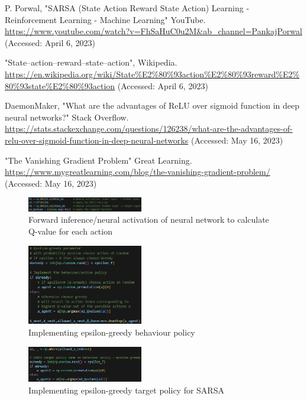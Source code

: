\documentclass[conference]{IEEEtran}
\begin{document}
\begin{thebibliography}{00}
 P. Porwal, "SARSA (State Action Reward State Action) Learning - Reinforcement Learning - Machine Learning" YouTube. \url{https://www.youtube.com/watch?v=FhSaHuC0u2M&ab_channel=PankajPorwal} (Accessed: April 6, 2023)

 "State–action–reward–state–action", Wikipedia. \url{https://en.wikipedia.org/wiki/State%E2%80%93action%E2%80%93reward%E2%80%93state%E2%80%93action} (Accessed: April 6, 2023)

 DaemonMaker, "What are the advantages of ReLU over sigmoid function in deep neural networks?" Stack Overflow. \url{https://stats.stackexchange.com/questions/126238/what-are-the-advantages-of-relu-over-sigmoid-function-in-deep-neural-networks} (Accessed: May 16, 2023)

 "The Vanishing Gradient Problem" Great Learning. \url{https://www.mygreatlearning.com/blog/the-vanishing-gradient-problem/} (Accessed: May 16, 2023)

\end{thebibliography}

\appendix

\begin{figure}[htbp]
\centerline{\includegraphics[width=0.45\textwidth]{images/forward_inference.png}}
\caption{Forward inference/neural activation of neural network to calculate Q-value for each action}
\label{fig:forward_inference}
\end{figure}

\begin{figure}[htbp]
\centerline{\includegraphics[width=0.45\textwidth]{images/behaviour_policy.png}}
\caption{Implementing epsilon-greedy behaviour policy}
\label{fig:behaviour_policy}
\end{figure}

\begin{figure}[htbp]
\centerline{\includegraphics[width=0.45\textwidth]{images/target_policy_sarsa.png}}
\caption{Implementing epsilon-greedy target policy for SARSA}
\label{fig:target_policy_sarsa}
\end{figure}
\end{document}
